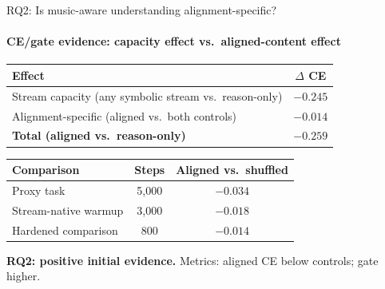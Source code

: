 \documentclass[aspectratio=169,11pt]{beamer}
\renewcommand{\arraystretch}{1.18}
\begin{document}
\begin{frame}{RQ2: Is music-aware understanding alignment-specific?}
  \framesubtitle{CE/gate evidence: capacity effect vs.\ aligned-content effect}

  {\footnotesize\renewcommand{\arraystretch}{1.0}
  \begin{tabular}{p{7.5cm}c}
    \toprule
    \textbf{Effect} & \textbf{$\Delta$ CE} \\
    \midrule
    Stream capacity (any symbolic stream vs.\ reason-only) & $-0.245$ \\
    Alignment-specific (aligned vs.\ both controls)        & $-0.014$ \\
    \midrule
    \textbf{Total (aligned vs.\ reason-only)} & $\mathbf{-0.259}$ \\
    \bottomrule
  \end{tabular}}

  \vspace{2pt}
  {\footnotesize\renewcommand{\arraystretch}{1.0}
  \begin{tabular}{p{4.5cm}cc}
    \toprule
    \textbf{Comparison} & \textbf{Steps} & \textbf{Aligned vs.\ shuffled} \\
    \midrule
    Proxy task           & 5{,}000 & $-0.034$ \\
    Stream-native warmup & 3{,}000 & $-0.018$ \\
    Hardened comparison  &   800   & $-0.014$ \\
    \bottomrule
  \end{tabular}}

  \vspace{2pt}
  \begin{tcolorbox}[good,top=2pt,bottom=2pt,fontupper=\footnotesize]
    \textbf{RQ2: positive initial evidence.} Metrics: aligned CE below controls; gate higher.
  \end{tcolorbox}
\end{frame}
\end{document}
